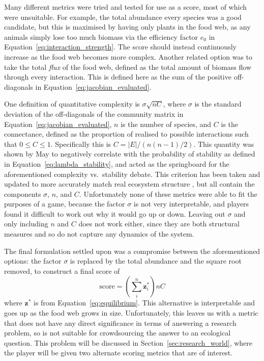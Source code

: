 Many different metrics were tried and tested for use as a score, most of which were unsuitable. For example, the total abundance every species was a good candidate, but this is maximised by having only plants in the food web, as any animals simply lose too much biomass via the efficiency factor $e_0$ in Equation~\eqref{eq:interaction_strength}. The score should instead continuously increase as the food web becomes more complex. Another related option was to take the total \emph{flux} of the food web, defined as the total amount of biomass flow through every interaction. This is defined here as the sum of the positive off-diagonals in Equation~\eqref{eq:jacobian_evaluated}.

One definition of quantitative complexity is $\sigma\sqrt{nC}$, where $\sigma$ is the standard deviation of the off-diagonals of the community matrix in Equation~\ref{eq:jacobian_evaluated}, $n$ is the number of species, and $C$ is the connectance, defined as the proportion of realised to possible interactions such that $0\leq C\leq1$. Specifically this is $C=|E| / (n(n-1)/2)$. This quantity was shown by May to negatively correlate with the probability of stability as defined in Equation~\eqref{eq:lambda_stability}, and acted as the springboard for the aforementioned complexity vs.\ stability debate.
This criterion has been taken and updated to more accurately match real ecosystem structure \cite{Allesina2012, Tang2014Correlation}, but all contain the components $\sigma$, $n$, and $C$.
Unfortunately none of these metrics were able to fit the purposes of a game, because the factor $\sigma$ is not very interpretable, and players found it difficult to work out why it would go up or down.
Leaving out $\sigma$ and only including $n$ and $C$ does not work either, since they are both structural measures and so do not capture any dynamics of the system.

The final formulation settled upon was a compromise between the aforementioned options: the factor $\sigma$ is replaced by the total abundance and the square root removed, to construct a final score of
\begin{equation}
  \mathrm{score} = \left(\sum^n_i\mathbf{z}^*_i\right)nC
  \label{eq:score}
\end{equation}
where $\mathbf{z^*}$ is from Equation~\eqref{eq:equilibrium}. This alternative is interpretable and goes up as the food web grows in size.
Unfortunately, this leaves us with a metric that does not have any direct significance in terms of answering a research problem, so is not suitable for crowdsourcing the answer to an ecological question. This problem will be discussed in Section~\ref{sec:research_world}, where the player will be given two alternate scoring metrics that are of interest.

